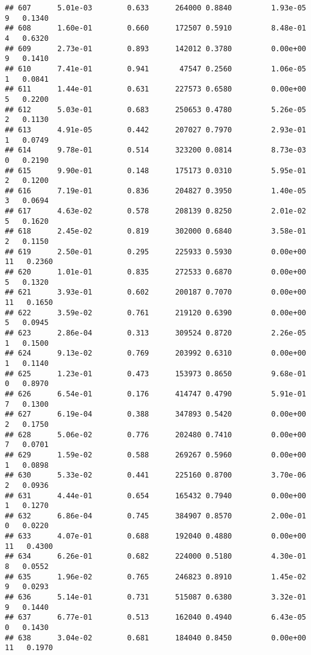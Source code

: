 \documentclass[
]{article}
\begin{document}
\begin{verbatim}
## 607      5.01e-03        0.633      264000 0.8840         1.93e-05   9   0.1340
## 608      1.60e-01        0.660      172507 0.5910         8.48e-01   4   0.6320
## 609      2.73e-01        0.893      142012 0.3780         0.00e+00   9   0.1410
## 610      7.41e-01        0.941       47547 0.2560         1.06e-05   1   0.0841
## 611      1.44e-01        0.631      227573 0.6580         0.00e+00   5   0.2200
## 612      5.03e-01        0.683      250653 0.4780         5.26e-05   2   0.1130
## 613      4.91e-05        0.442      207027 0.7970         2.93e-01   1   0.0749
## 614      9.78e-01        0.514      323200 0.0814         8.73e-03   0   0.2190
## 615      9.90e-01        0.148      175173 0.0310         5.95e-01   2   0.1200
## 616      7.19e-01        0.836      204827 0.3950         1.40e-05   3   0.0694
## 617      4.63e-02        0.578      208139 0.8250         2.01e-02   5   0.1620
## 618      2.45e-02        0.819      302000 0.6840         3.58e-01   2   0.1150
## 619      2.50e-01        0.295      225933 0.5930         0.00e+00  11   0.2360
## 620      1.01e-01        0.835      272533 0.6870         0.00e+00   5   0.1320
## 621      3.93e-01        0.602      200187 0.7070         0.00e+00  11   0.1650
## 622      3.59e-02        0.761      219120 0.6390         0.00e+00   5   0.0945
## 623      2.86e-04        0.313      309524 0.8720         2.26e-05   1   0.1500
## 624      9.13e-02        0.769      203992 0.6310         0.00e+00   1   0.1140
## 625      1.23e-01        0.473      153973 0.8650         9.68e-01   0   0.8970
## 626      6.54e-01        0.176      414747 0.4790         5.91e-01   7   0.1300
## 627      6.19e-04        0.388      347893 0.5420         0.00e+00   2   0.1750
## 628      5.06e-02        0.776      202480 0.7410         0.00e+00   7   0.0701
## 629      1.59e-02        0.588      269267 0.5960         0.00e+00   1   0.0898
## 630      5.33e-02        0.441      225160 0.8700         3.70e-06   2   0.0936
## 631      4.44e-01        0.654      165432 0.7940         0.00e+00   1   0.1270
## 632      6.86e-04        0.745      384907 0.8570         2.00e-01   0   0.0220
## 633      4.07e-01        0.688      192040 0.4880         0.00e+00  11   0.4300
## 634      6.26e-01        0.682      224000 0.5180         4.30e-01   8   0.0552
## 635      1.96e-02        0.765      246823 0.8910         1.45e-02   9   0.0293
## 636      5.14e-01        0.731      515087 0.6380         3.32e-01   9   0.1440
## 637      6.77e-01        0.513      162040 0.4940         6.43e-05   0   0.1430
## 638      3.04e-02        0.681      184040 0.8450         0.00e+00  11   0.1970

\end{verbatim}
\end{document}
